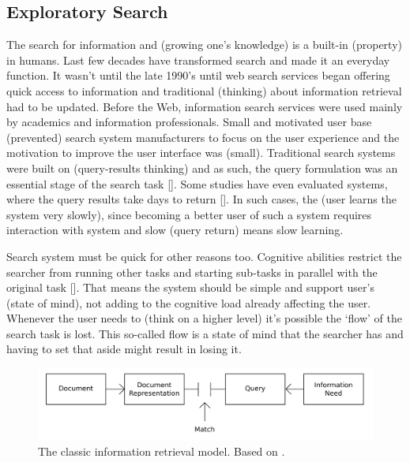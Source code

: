 \subsection{Exploratory Search}
The search for information and (growing one's knowledge) is a built-in (property) in humans. Last few decades have transformed search and made it an everyday function. It wasn't until the late 1990's until web search services began offering quick access to information and traditional (thinking) about information retrieval had to be updated. Before the Web, information search services were used mainly by academics and information professionals. Small and motivated user base (prevented) search system manufacturers to focus on the user experience and the motivation to improve the user interface was (small). Traditional search systems were built on (query-results thinking) and as such, the query formulation was an essential stage of the search task []. Some studies have even evaluated systems, where the query results take days to return []. In such cases, the (user learns the system very slowly), since becoming a better user of such a system requires interaction with system and slow (query return) means slow learning.

Search system must be quick for other reasons too. Cognitive abilities restrict the searcher from running other tasks and starting sub-tasks in parallel with the original task []. That means the system should be simple and support user's (state of mind), not adding to the cognitive load already affecting the user. Whenever the user needs to (think on a higher level) it's possible the ‘flow' of the search task is lost. This so-called flow is a state of mind that the searcher has and having to set that aside might result in losing it.

\begin{figure}[htp] %
\caption{The classic information retrieval model. Based on \protect\cite{bates89}.}
\label{figure_classicIR}
\centering
\includegraphics[scale=0.45]{figures/classicIR.pdf}
\end{figure}

